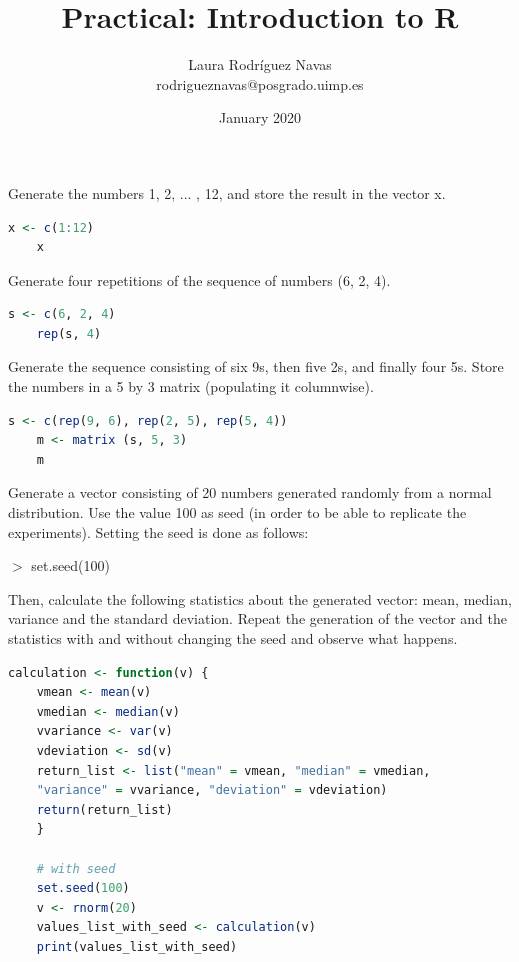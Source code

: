 \documentclass{exam}
\title{Practical: Introduction to R}
\author{Laura Rodríguez Navas \\ rodrigueznavas@posgrado.uimp.es}
\date{January 2020}
\begin{document}
	
	\maketitle

\begin{questions}
    
    \question Generate the numbers 1, 2, ... , 12, and store the result in the vector x.    
    \begin{lstlisting}[language=R, numbersep=0pt, resetmargins=true]
   	x <- c(1:12)
   	x
    \end{lstlisting}
  
    \question Generate four repetitions of the sequence of numbers (6, 2, 4).    
    \begin{lstlisting}[language=R, numbersep=0pt, resetmargins=true]
	s <- c(6, 2, 4)
	rep(s, 4)
    \end{lstlisting}
    
    \question Generate the sequence consisting of six 9s, then five 2s, and finally four 5s. Store the numbers in a 5 by 3 matrix (populating it columnwise).    
    \begin{lstlisting}[language=R, numbersep=0pt, resetmargins=true]
   	s <- c(rep(9, 6), rep(2, 5), rep(5, 4))
   	m <- matrix (s, 5, 3)
   	m
    \end{lstlisting}
    
    \question Generate a vector consisting of 20 numbers generated randomly from a normal distribution. Use the value 100 as seed (in order to be able to replicate the experiments). Setting the seed is done as follows: 
    
    $>$ set.seed(100)
    
    Then, calculate the following statistics about the generated vector: mean, median, variance and the standard deviation. Repeat the generation of the vector and the statistics with and without changing the seed and observe what happens. 
    
    \begin{lstlisting}[language=R, numbersep=0pt, resetmargins=true]
    calculation <- function(v) {
    vmean <- mean(v)
    vmedian <- median(v)
    vvariance <- var(v)
    vdeviation <- sd(v)
    return_list <- list("mean" = vmean, "median" = vmedian, 
    "variance" = vvariance, "deviation" = vdeviation)
    return(return_list)
    }
      
    # with seed    
    set.seed(100)
    v <- rnorm(20)
    values_list_with_seed <- calculation(v)
    print(values_list_with_seed)
    

\end{lstlisting}
\end{questions}
\end{document}
